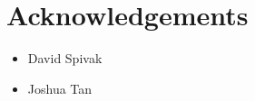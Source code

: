
\section{Acknowledgements}

\begin{itemize}
    \item David Spivak
    \item Joshua Tan
\end{itemize}


\vfill
